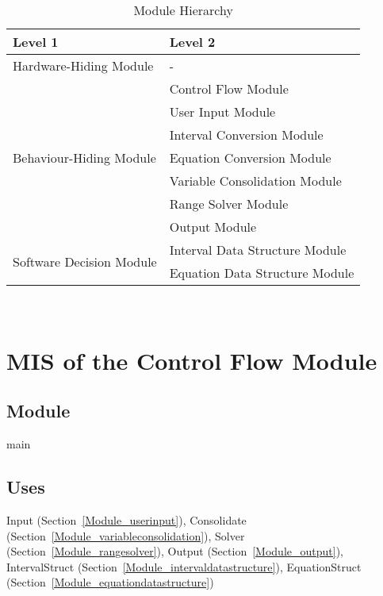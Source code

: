 \documentclass[12pt, titlepage]{article}
\begin{document}
\begin{table}[h!]
	\centering
	\begin{tabular}{p{} p{}}
		\toprule
		\textbf{Level 1} & \textbf{Level 2}\\
		\midrule
		
		{Hardware-Hiding Module} & - \\
		\midrule
		
		\multirow{7}{0.29\textwidth}{Behaviour-Hiding Module} & Control Flow 
		Module \\
		& User Input Module \\
		& Interval Conversion Module \\
		& Equation Conversion Module \\
		& Variable Consolidation Module \\
		& Range Solver Module \\
		& Output Module \\
		\midrule
		
		\multirow{2}{0.29\textwidth}{Software Decision Module} & Interval Data 
		Structure Module \\
		& Equation Data Structure Module \\
		\bottomrule
		
	\end{tabular}
	\caption{Module Hierarchy}
	\label{TblMH}
\end{table}

\newpage
~\newpage

\section{MIS of the Control Flow Module} 
\label{Module_controlflow}

\subsection{Module}

main

\subsection{Uses}

Input (Section~\ref{Module_userinput}), Consolidate 
(Section~\ref{Module_variableconsolidation}), Solver 
(Section~\ref{Module_rangesolver}), Output (Section~\ref{Module_output}), 
IntervalStruct (Section~\ref{Module_intervaldatastructure}), EquationStruct 
(Section~\ref{Module_equationdatastructure})
\end{document}
